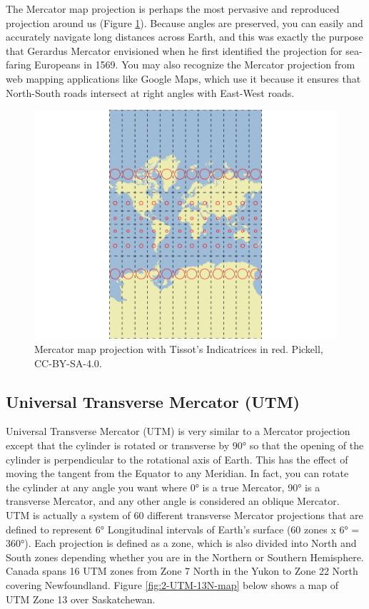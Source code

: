 \documentclass[
]{book}
\begin{document}
The Mercator map projection is perhaps the most pervasive and reproduced projection around us (Figure \ref{fig:2-Mercator-map}). Because angles are preserved, you can easily and accurately navigate long distances across Earth, and this was exactly the purpose that Gerardus Mercator envisioned when he first identified the projection for sea-faring Europeans in 1569. You may also recognize the Mercator projection from web mapping applications like Google Maps, which use it because it ensures that North-South roads intersect at right angles with East-West roads.

\begin{figure}
\includegraphics[width=0.75\linewidth]{images/02-Mercator-map} \caption{Mercator map projection with Tissot's Indicatrices in red. Pickell, CC-BY-SA-4.0.}\label{fig:2-Mercator-map}
\end{figure}

\subsection{Universal Transverse Mercator (UTM)}\label{universal-transverse-mercator-utm}

Universal Transverse Mercator (UTM) is very similar to a Mercator projection except that the cylinder is rotated or transverse by 90° so that the opening of the cylinder is perpendicular to the rotational axis of Earth. This has the effect of moving the tangent from the Equator to any Meridian. In fact, you can rotate the cylinder at any angle you want where 0° is a true Mercator, 90° is a transverse Mercator, and any other angle is considered an oblique Mercator. UTM is actually a system of 60 different transverse Mercator projections that are defined to represent 6° Longitudinal intervals of Earth's surface (60 zones x 6° = 360°). Each projection is defined as a zone, which is also divided into North and South zones depending whether you are in the Northern or Southern Hemisphere. Canada spans 16 UTM zones from Zone 7 North in the Yukon to Zone 22 North covering Newfoundland. Figure \ref{fig:2-UTM-13N-map} below shows a map of UTM Zone 13 over Saskatchewan.
\end{document}
